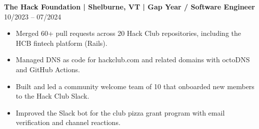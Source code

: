 \noindent
\textbf{The Hack Foundation | Shelburne, VT | Gap Year / Software Engineer} \hfill 10/2023 -- 07/2024
\begin{itemize}
    \item Merged 60+ pull requests across 20 Hack Club repositories, including the HCB fintech platform (Rails).
    \item Managed DNS as code for hackclub.com and related domains with octoDNS and GitHub Actions.
    \item Built and led a community welcome team of 10 that onboarded new members to the Hack Club Slack.
    \item Improved the Slack bot for the club pizza grant program with email verification and channel reactions.
\end{itemize}
